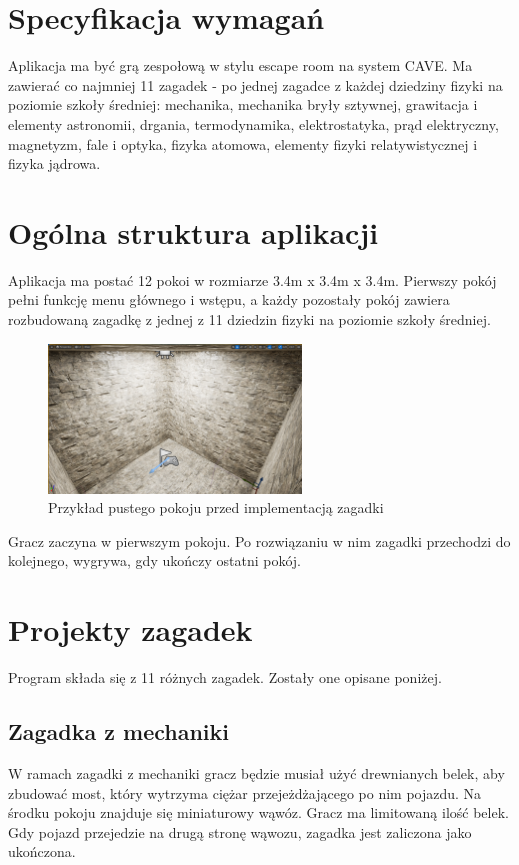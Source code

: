 \section{Specyfikacja wymagań}
Aplikacja ma być grą zespołową w stylu escape room na system CAVE. Ma zawierać co najmniej 11 zagadek - po jednej zagadce z każdej dziedziny fizyki na poziomie szkoły średniej: mechanika, mechanika bryły sztywnej, grawitacja i elementy astronomii, drgania, termodynamika, elektrostatyka, prąd elektryczny, magnetyzm, fale i optyka, fizyka atomowa, elementy fizyki relatywistycznej i fizyka jądrowa.

\section{Ogólna struktura aplikacji}
Aplikacja ma postać 12 pokoi w rozmiarze 3.4m x 3.4m x 3.4m. Pierwszy pokój pełni funkcję menu głównego i wstępu, a każdy pozostały pokój zawiera rozbudowaną zagadkę z jednej z 11 dziedzin fizyki na poziomie szkoły średniej.

\begin{figure}[h!]
    \centering
    \includegraphics[width=0.6\textwidth]{images/empty_room.png}
    \caption{Przykład pustego pokoju przed implementacją zagadki}
    \label{img:empty_room}
\end{figure}

Gracz zaczyna w pierwszym pokoju. Po rozwiązaniu w nim zagadki przechodzi do kolejnego, wygrywa, gdy ukończy ostatni pokój.\

\section{Projekty zagadek}

Program składa się z 11 różnych zagadek. Zostały one opisane poniżej.

\subsection{Zagadka z mechaniki}
W ramach zagadki z mechaniki gracz będzie musiał użyć drewnianych belek, aby zbudować most, który wytrzyma ciężar przejeżdżającego po nim pojazdu. Na środku pokoju znajduje się miniaturowy wąwóz. Gracz ma limitowaną ilość belek. Gdy pojazd przejedzie na drugą stronę wąwozu, zagadka jest zaliczona jako ukończona.

